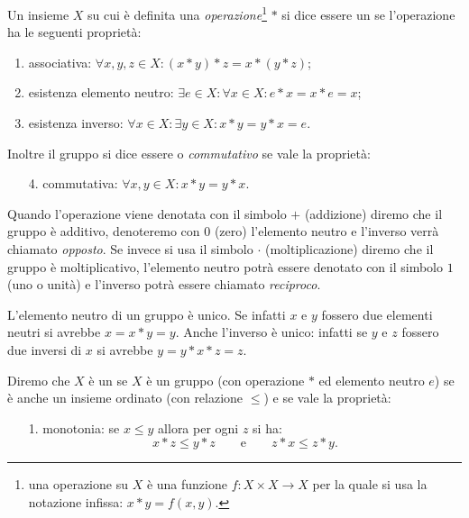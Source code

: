 \begin{definition}[gruppo]
Un insieme $X$ su cui è definita una \emph{operazione}\footnote{%
una operazione su $X$ è una funzione $f\colon X\times X \to X$ per la quale
si usa la notazione infissa: $x*y = f(x,y)$.}
$*$ si dice essere un  se l'operazione
ha le seguenti proprietà:
\begin{enumerate}
  \item associativa: $\forall x,y,z\in X\colon (x*y)*z = x*(y*z)$;
  \item esistenza elemento neutro: 
  $\exists e\in X\colon \forall x\in X \colon e*x=x*e = x$;
  \item esistenza inverso: 
  $\forall x\in X\colon \exists y\in X\colon x*y=y*x=e$.
\end{enumerate}
Inoltre il gruppo si dice essere  o \emph{commutativo}
se vale la proprietà:
\begin{enumerate}
  \item[4.] commutativa: $\forall x,y\in X\colon x*y = y*x$.
\end{enumerate}

Quando l'operazione viene denotata con il simbolo $+$ (addizione)
diremo che il gruppo è additivo, denoteremo con $0$ 
%
(zero) l'elemento neutro e l'inverso verrà chiamato \emph{opposto}.
%
Se invece si usa il simbolo $\cdot$ (moltiplicazione)
diremo che il gruppo è moltiplicativo, l'elemento neutro potrà 
essere denotato con il simbolo $1$ (uno o unità) e 
%
l'inverso potrà essere chiamato \emph{reciproco}.
%
\end{definition}

L'elemento neutro di un gruppo è unico. 
Se infatti $x$ e $y$ fossero due elementi neutri 
si avrebbe $x = x*y = y$. 
Anche l'inverso è unico: infatti se $y$ e $z$ fossero 
due inversi di $x$ si avrebbe $y = y * x * z = z$.

\begin{definition}
  Diremo che $X$ è un  se $X$ è un gruppo
  (con operazione $*$ ed elemento neutro $e$) 
  se è anche un insieme ordinato (con relazione $\le$)
  e se vale la proprietà:
  \begin{enumerate}
    \item[1.] monotonia: se $x\le y$ allora per ogni $z$ si ha:
     \[
     x*z \le y*z \qquad\text{e}\qquad z*x \le z*y.
     \] 
  \end{enumerate}
\end{definition}

